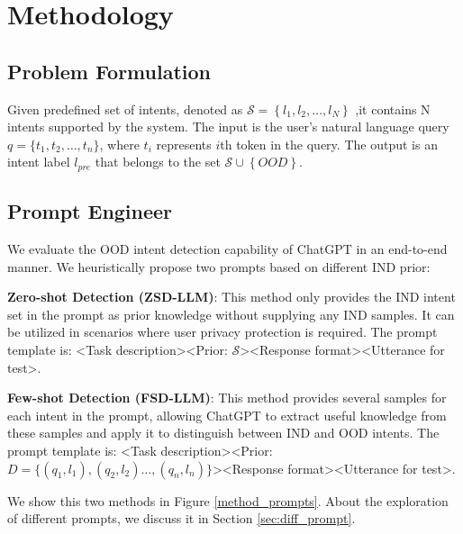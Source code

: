 \documentclass[10pt, a4paper]{article}
\begin{document}
\section{Methodology}
\label{sec:method}
\subsection{Problem Formulation}
Given predefined set of intents, denoted as $\mathcal S=\left\{l_{1}, l_{2}, \ldots, l_{N}\right\}$ 
,it contains N intents supported by the system. The input is the user's natural language query $q = \{t_1, t_2, \dots, t_n\}$, where $t_{i}$ represents $i$th token in the query. The output is an intent label $ l_{pre} $ that belongs to the set $ \mathcal {S} \cup \left\{ OOD \right\}$.


\subsection{Prompt Engineer}

We evaluate the OOD intent detection capability of ChatGPT in an end-to-end manner. We heuristically propose two prompts based on different IND prior:

\textbf{Zero-shot Detection (ZSD-LLM)}: This method only provides the IND intent set in the prompt as prior knowledge without supplying any IND samples. It can be utilized in scenarios where user privacy protection is required. The prompt template is: <Task description><Prior: $\mathcal {S}$><Response format><Utterance for test>.

\textbf{Few-shot Detection (FSD-LLM)}: This method provides several samples for each intent in the prompt, allowing ChatGPT to extract useful knowledge from these samples and apply it to distinguish between IND and OOD intents. The prompt template is: <Task description><Prior: $D = \{(q_1, l_1), (q_2,l_2) \dots, (q_n,l_n)\}$><Response format><Utterance for test>.


 We show this two methods in Figure \ref{method_prompts}. About the exploration of different prompts, we discuss it in Section \ref{sec:diff_prompt}.
\end{document}
